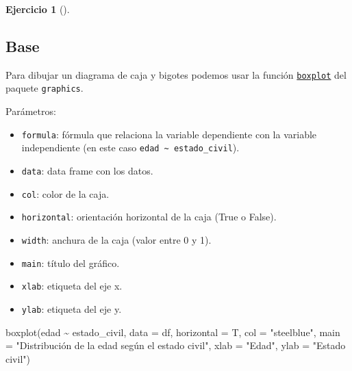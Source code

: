 \documentclass[
  spanish,
  a4paper,
]{scrreport}
\newenvironment{Shaded}{\begin{snugshade}}{\end{snugshade}}
\newcommand{\AttributeTok}[1]{\textcolor[rgb]{0.40,0.45,0.13}{#1}}
\newcommand{\FunctionTok}[1]{\textcolor[rgb]{0.28,0.35,0.67}{#1}}
\newcommand{\NormalTok}[1]{\textcolor[rgb]{0.00,0.23,0.31}{#1}}
\newcommand{\SpecialCharTok}[1]{\textcolor[rgb]{0.37,0.37,0.37}{#1}}
\newcommand{\StringTok}[1]{\textcolor[rgb]{0.13,0.47,0.30}{#1}}
\providecommand{\tightlist}{%
  \setlength{\itemsep}{0pt}\setlength{\parskip}{0pt}}
\theoremstyle{definition}
\newtheorem{exercise}{Ejercicio}[chapter]
\theoremstyle{remark}
\begin{document}
\begin{exercise}[]
\begin{enumerate}
\begin{tcolorbox}
  \section{Base}

  Para dibujar un diagrama de caja y bigotes podemos usar la función
  \href{https://www.rdocumentation.org/packages/graphics/versions/3.6.2/topics/boxplot}{\texttt{boxplot}}
  del paquete \texttt{graphics}.

  Parámetros:

  \begin{itemize}
  \tightlist
  \item
    \texttt{formula}: fórmula que relaciona la variable dependiente con
    la variable independiente (en este caso
    \texttt{edad\ \textasciitilde{}\ estado\_civil}).
  \item
    \texttt{data}: data frame con los datos.
  \item
    \texttt{col}: color de la caja.
  \item
    \texttt{horizontal}: orientación horizontal de la caja (True o
    False).
  \item
    \texttt{width}: anchura de la caja (valor entre 0 y 1).
  \item
    \texttt{main}: título del gráfico.
  \item
    \texttt{xlab}: etiqueta del eje x.
  \item
    \texttt{ylab}: etiqueta del eje y.
  \end{itemize}

\begin{Shaded}
\begin{Highlighting}[]
\FunctionTok{boxplot}\NormalTok{(edad }\SpecialCharTok{\textasciitilde{}}\NormalTok{ estado\_civil, }\AttributeTok{data =}\NormalTok{ df, }\AttributeTok{horizontal =}\NormalTok{ T, }\AttributeTok{col =} \StringTok{"steelblue"}\NormalTok{, }\AttributeTok{main =} \StringTok{"Distribución de la edad según el estado civil"}\NormalTok{, }\AttributeTok{xlab =} \StringTok{"Edad"}\NormalTok{, }\AttributeTok{ylab =} \StringTok{"Estado civil"}\NormalTok{)}
\end{Highlighting}
\end{Shaded}


\end{tcolorbox}
\end{enumerate}
\end{exercise}
\end{document}
